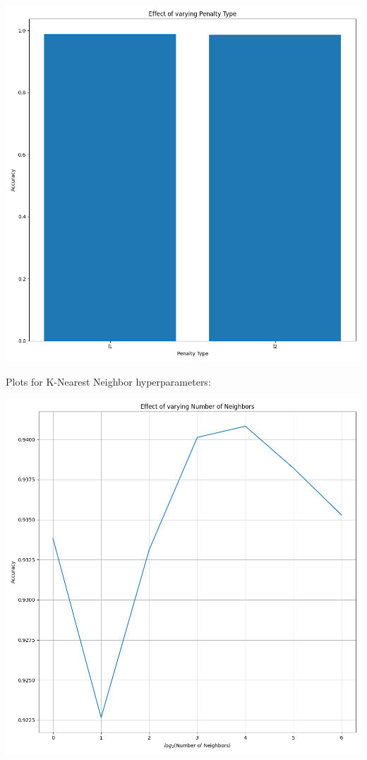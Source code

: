 \documentclass[12pt, letterpaper]{article}
\begin{document}
\includegraphics[scale=\myscale]{logistic_regression_Penalty Type.png}

Plots for K-Nearest Neighbor hyperparameters:

\includegraphics[scale=\myscale]{knn_Number of Neighbors.png}
\end{document}
